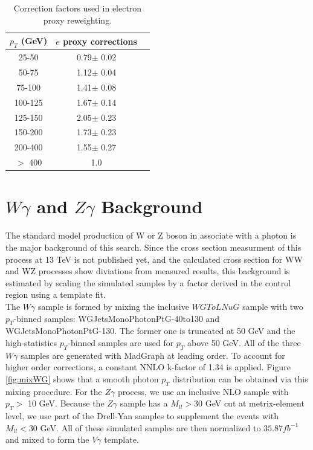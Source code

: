 \documentclass[thesis.tex]{subfiles}
\renewcommand\_{\textunderscore\allowbreak}
\begin{document}
\begin{table}[htdp]
	\centering
  \begin{tabular}{|c|c|c|}
  \hline
  $p_T$ (GeV)  & $e$ proxy corrections \\ \hline
  25-50  & 0.79$\pm$ 0.02  \\ \hline
  50-75  & 1.12$\pm$ 0.04  \\ \hline
  75-100 & 1.41$\pm$ 0.08  \\ \hline 
  100-125& 1.67$\pm$ 0.14  \\ \hline 
  125-150& 2.05$\pm$ 0.23  \\ \hline 
  150-200& 1.73$\pm$ 0.23  \\ \hline
  200-400& 1.55$\pm$ 0.27  \\ \hline
  $>$ 400& 1.0 \\ \hline 
  \end{tabular}
  \caption{Correction factors used in electron proxy reweighting.}
  \label{table:correctionsfakelep}
\end{table}

\section{$W\gamma$ and $Z\gamma$ Background}\label{subsec:VG}
The standard model production of W or Z boson in associate with a photon is the major background of this search. Since the cross section measurment of this process at 13 TeV is not published yet, and the calculated cross section for WW and WZ processes show diviations from measured results, this background is estimated by scaling the simulated samples by a factor derived in the control region using a template fit. \\ 

The $W\gamma$ sample is formed by mixing the inclusive $WGToLNuG$ sample with two $p_T$-binned samples: WGJets\_MonoPhoton\_PtG-40to130 and WGJets\_MonoPhoton\_PtG-130. The former one is truncated at 50 GeV and the high-statistics $p_T$-binned samples are used for $p_T$ above 50 GeV. All of the three $W\gamma$ samples are generated with MadGraph at leading order. To account for higher order corrections, a constant NNLO k-factor of 1.34 is applied. Figure \ref{fig:mixWG} shows that a smooth photon $p_{T}$ distribution can be obtained via this mixing procedure. For the $Z\gamma$ process, we use an inclusive NLO sample with $p_T >$ 10 GeV. Because the $Z\gamma$ sample has a $M_{ll} > 30$ GeV cut at metrix-element level, we use part of the Drell-Yan samples to supplement the events with $M_{ll} < 30$ GeV. All of these simulated samples are then normalized to $35.87 fb^{-1}$ and mixed to form the $V\gamma$ template.
\end{document}
